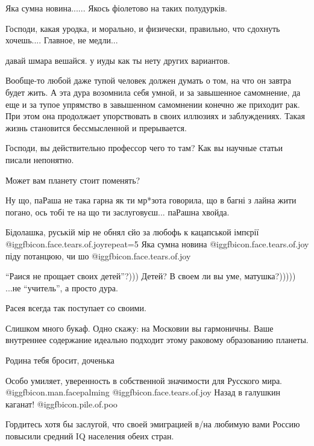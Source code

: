 \begin{itemize}
Яка сумна новина...... Якось фіолетово на таких полудурків.

Господи, какая уродка, и морально, и физически, правильно, что сдохнуть хочешь.... Главное, не медли...

давай шмара вешайся. у иуды как ты нету других вариантов.


Вообще-то любой даже тупой человек должен думать о том, на что он завтра будет
жить. А эта дура возомнила себя умной, и за завышенное самомнение, да еще и за
тупое упрямство в завышенном самомнении конечно же приходит рак. При этом она
продолжает упорствовать в своих иллюзиях и заблуждениях. Такая жизнь становится
бессмысленной и прерывается.


Господи, вы действительно профессор чего то там? Как вы научные статьи писали непонятно.

Может вам планету стоит поменять?

Ну що, паРаша не така гарна як ти мр*зота говорила, що в багні з лайна жити погано, ось тобі те на що ти заслуговуєш... паРашна хвойда.


Бідолашка, руській мір не обнял єйо за любофь к кацапськой імпєрії  @igg{fbicon.face.tears.of.joy}{repeat=5} 
Яка сумна новина @igg{fbicon.face.tears.of.joy}  піду потанцюю, чи шо @igg{fbicon.face.tears.of.joy} 

\enquote{Раися не прощает своих детей}?))) Детей? В своем ли вы уме, матушка?))))) ...не \enquote{учитель}, а просто дура.

Расея всегда так поступает со своими.

Слишком много букаф. Одно скажу: на Московии вы гармоничны. Ваше внутреннее содержание идеально подходит этому раковому образованию планеты.

Родина тебя бросит, доченька

Особо умиляет, уверенность в собственной значимости для Русского мира.  @igg{fbicon.man.facepalming}  @igg{fbicon.face.tears.of.joy} 
Назад в галушкин каганат! @igg{fbicon.pile.of.poo} 

Гордитесь хотя бы заслугой, что своей эмиграцией в/на любимую вами Россию повысили средний IQ населения обеих стран.


\end{itemize}
